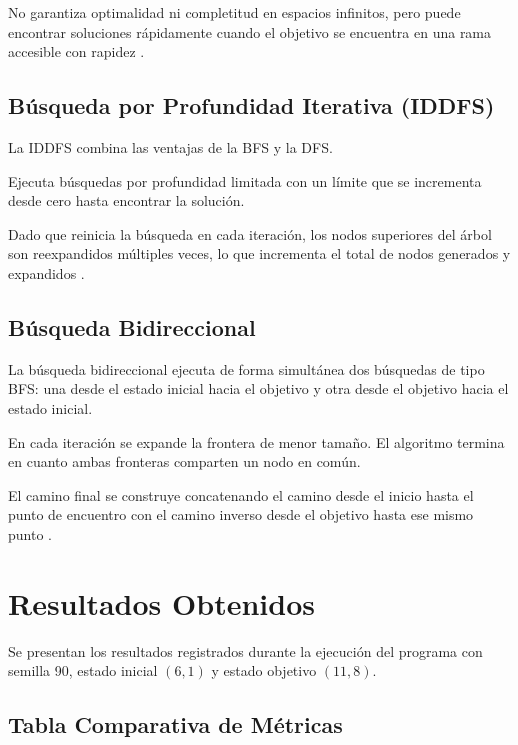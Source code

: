 \documentclass{article}
\begin{document}
No garantiza optimalidad ni completitud en espacios infinitos, pero
puede encontrar soluciones rápidamente cuando el objetivo se encuentra
en una rama accesible con rapidez \cite{russell2021artificial}.

\subsection{Búsqueda por Profundidad Iterativa (IDDFS)}

La IDDFS combina las ventajas de la BFS y la DFS.

Ejecuta búsquedas por profundidad limitada con un límite que se
incrementa desde cero hasta encontrar la solución.

Dado que reinicia la búsqueda en cada iteración, los nodos superiores
del árbol son reexpandidos múltiples veces, lo que incrementa el total
de nodos generados y expandidos \cite{russell2021artificial}.

\subsection{Búsqueda Bidireccional}

La búsqueda bidireccional ejecuta de forma simultánea dos búsquedas
de tipo BFS: una desde el estado inicial hacia el objetivo y otra
desde el objetivo hacia el estado inicial.

En cada iteración se expande la frontera de menor tamaño. El algoritmo
termina en cuanto ambas fronteras comparten un nodo en común.

El camino final se construye concatenando el camino desde el inicio
hasta el punto de encuentro con el camino inverso desde el objetivo
hasta ese mismo punto \cite{russell2021artificial}.


\section{Resultados Obtenidos}

Se presentan los resultados registrados durante la ejecución del
programa con semilla 90, estado inicial $(6,1)$ y estado objetivo
$(11,8)$.

\subsection{Tabla Comparativa de Métricas}
\end{document}
